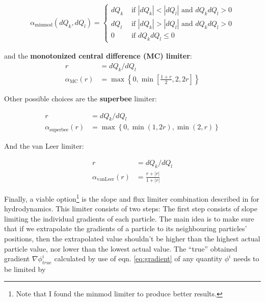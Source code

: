 \begin{align}
    \alpha_{\text{minmod}}(dQ_k, dQ_l) = 
    \begin{cases}
      dQ_k      & \text{ if } |dQ_k| < |dQ_l| \text{ and } dQ_k dQ_l > 0 \\
      dQ_l      & \text{ if } |dQ_k| > |dQ_l| \text{ and } dQ_k dQ_l > 0 \\
      0         & \text{ if }  dQ_k dQ_l \leq 0 
    \end{cases}
\end{align}

and the \textbf{monotonized central difference (MC) limiter}:
\begin{align}
	r &= dQ_k / dQ_l \\
	\alpha_{\text{MC}}(r) &= \max \left\{ 0, \min\left[\frac{1 + r}{2}, 2, 2r \right] \right\}
\end{align}

Other possible choices are the \textbf{superbee} limiter:

\begin{align}
	r &= dQ_k / dQ_l \\
	\alpha_{\text{superbee}}(r) &= \max \left\{0,  \min (1, 2r), \min(2, r) \right\}
\end{align}


And the van Leer limiter:

\begin{align}
	r &= dQ_k / dQ_l \\
	\alpha_{\text{vanLeer}}(r) &= \frac{r + |r|}{1 + |r|}
\end{align}




Finally, a viable option\footnote{Note that I found the minmod limiter to produce better results.} 
is the slope and flux limiter combination described in \cite{hopkinsGIZMONewClass2015} for 
hydrodynamics. This limiter consists of two steps: The first step consists of slope limiting the 
individual gradients of each particle. The main idea is to make sure that if we extrapolate the 
gradients of a particle to its neighbouring particles' positions, then the extrapolated value 
shouldn't be higher than the highest actual particle value, nor lower than the lowest actual value. 
The ``true'' obtained gradient $\nabla \phi^i_{true}$ calculated by use of eqn. \ref{eq:gradient} of 
any quantity $\phi^i$ needs to be limited by

